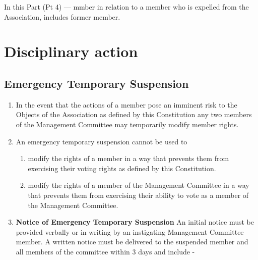\documentclass[../constitution.tex]{subfiles}
\begin{document}
In this Part (Pt 4) --- mmber in relation to a member who is expelled from the Association, includes former member.

\hypertarget{division-2-disciplinary-action}{%
\section{Disciplinary action}\label{division-2-disciplinary-action}}

\hypertarget{emergency-temporary-suspension}{%
\subsection{Emergency Temporary Suspension}\label{emergency-temporary-suspension}}

\begin{enumerate}

\item In the event that the actions of a member pose an imminent risk to the Objects of the Association as defined by this Constitution any two members of the Management Committee may temporarily modify member rights.
\item An emergency temporary suspension cannot be used to

  \begin{enumerate}
  
  \item modify the rights of a member in a way that prevents them from exercising their voting rights as defined by this Constitution.
  \item modify the rights of a member of the Management Committee in a way that prevents them from exercising their ability to vote as a member of the Management Committee.
  \end{enumerate}
\item \textbf{Notice of Emergency Temporary Suspension} An initial notice must be provided verbally or in writing by an instigating Management Committee member. A written notice must be delivered to the suspended member and all members of the committee within 3 days and include -

  \begin{enumerate}
  

\end{enumerate}
\end{enumerate}
\end{document}
